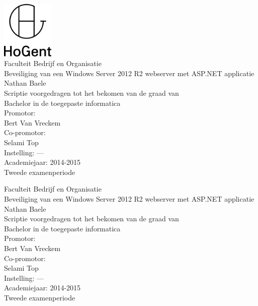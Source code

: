 \documentclass[pdftex,a4paper,12pt]{report}
\newcommand{\emptypage}{
\newpage
\thispagestyle{empty}
\mbox{}
\newpage
}
\newcommand{\student}{Nathan Baele}
\newcommand{\promotor}{Bert Van Vreckem}
\newcommand{\copromotor}{Selami Top}
\newcommand{\instelling}{---}
\newcommand{\titel}{Beveiliging van een Windows Server 2012 R2 webserver met ASP.NET applicatie}
\newcommand{\faculteit}{Faculteit Bedrijf en Organisatie}
\newcommand{\rapporttype}{Scriptie voorgedragen tot het bekomen van de graad van\\Bachelor in de toegepaste informatica}
\newcommand{\academiejaar}{2014-2015}
\newcommand{\examenperiode}{Tweede examenperiode}
\begin{document}
 \sloppy


\begin{titlepage}
  \begin{center}

    \begingroup
    \rmfamily
    \includegraphics[width=2.5cm]{img/HG-beeldmerk-woordmerk}\\[.5cm]
    \faculteit\\[3cm]
    \titel
    \vfill
    \student\\[3.5cm]
    \rapporttype\\[2cm]
    Promotor:\\
    \promotor\\
    Co-promotor:\\
    \copromotor\\[2.5cm]
    Instelling: \instelling\\[.5cm]
    Academiejaar: \academiejaar\\[.5cm]
    \examenperiode
    \endgroup

  \end{center}
  \restoregeometry
\end{titlepage}


\emptypage


\begin{titlepage}
  \begin{center}

    \begingroup
    \rmfamily
    \faculteit\\[3cm]
    \titel
    \vfill
    \student\\[3.5cm]
    \rapporttype\\[2cm]
    Promotor:\\
    \promotor\\
    Co-promotor:\\
    \copromotor\\[2.5cm]
    Instelling: \instelling\\[.5cm]
    Academiejaar: \academiejaar\\[.5cm]
    \examenperiode
    \endgroup

  \end{center}
  \restoregeometry
\end{titlepage}
\end{document}
